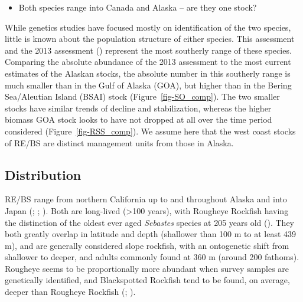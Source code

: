 \documentclass[
]{scrartcl}
\providecommand{\tightlist}{%
  \setlength{\itemsep}{0pt}\setlength{\parskip}{0pt}}\usepackage{longtable,booktabs,array}
\begin{document}
\begin{itemize}
\tightlist
\item
  Both species range into Canada and Alaska -- are they one stock?
\end{itemize}

While genetics studies have focused mostly on identification of the two
species, little is known about the population structure of either
species. This assessment and the 2013 assessment
()
represent the most southerly range of these species. Comparing the
absolute abundance of the 2013 assessment to the most current estimates
of the Alaskan stocks, the absolute number in this southerly range is
much smaller than in the Gulf of Alaska (GOA), but higher than in the
Bering Sea/Aleutian Island (BSAI) stock (Figure~\ref{fig-SO_comp}). The
two smaller stocks have similar trends of decline and stabilization,
whereas the higher biomass GOA stock looks to have not dropped at all
over the time period considered (Figure~\ref{fig-RSS_comp}). We assume
here that the west coast stocks of RE/BS are distinct management units
from those in Alaska.

\subsection{Distribution}\label{distribution}

RE/BS range from northern California up to and throughout Alaska and
into Japan (; ;
). Both are
long-lived (\textgreater100 years), with Rougheye Rockfish having the
distinction of the oldest ever aged \emph{Sebastes} species at 205 years
old (). They
both greatly overlap in latitude and depth (shallower than 100 m to at
least 439 m), and are generally considered slope rockfish, with an
ontogenetic shift from shallower to deeper, and adults commonly found at
360 m (around 200 fathoms). Rougheye seems to be proportionally more
abundant when survey samples are genetically identified, and
Blackspotted Rockfish tend to be found, on average, deeper than Rougheye
Rockfish (; ).
\end{document}
